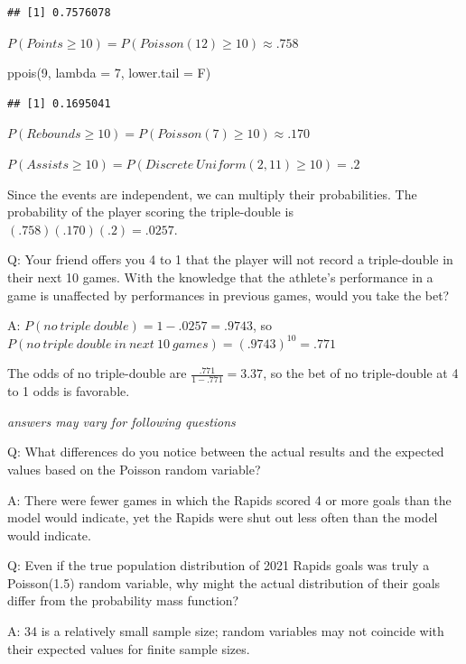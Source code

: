 \documentclass[
  11pt,
]{book}
\newenvironment{Shaded}{\begin{snugshade}}{\end{snugshade}}
\newcommand{\AttributeTok}[1]{\textcolor[rgb]{0.77,0.63,0.00}{#1}}
\newcommand{\DecValTok}[1]{\textcolor[rgb]{0.00,0.00,0.81}{#1}}
\newcommand{\FunctionTok}[1]{\textcolor[rgb]{0.00,0.00,0.00}{#1}}
\newcommand{\NormalTok}[1]{#1}
\theoremstyle{definition}
\theoremstyle{definition}
\theoremstyle{definition}
\theoremstyle{definition}
\theoremstyle{remark}
\begin{document}
\begin{verbatim}
## [1] 0.7576078
\end{verbatim}

\(P(Points \geq 10) = P(Poisson(12) \geq 10) \approx .758\)

\begin{Shaded}
\begin{Highlighting}[]
\FunctionTok{ppois}\NormalTok{(}\DecValTok{9}\NormalTok{, }\AttributeTok{lambda =} \DecValTok{7}\NormalTok{, }\AttributeTok{lower.tail =}\NormalTok{ F)}
\end{Highlighting}
\end{Shaded}

\begin{verbatim}
## [1] 0.1695041
\end{verbatim}

\(P(Rebounds \geq 10) = P(Poisson(7) \geq 10) \approx .170\)

\(P(Assists \geq 10) = P(Discrete\ Uniform(2, 11) \geq 10) = .2\)

Since the events are independent, we can multiply their probabilities. The probability of the player scoring the triple-double is \((.758)(.170)(.2) = .0257\).

Q: Your friend offers you 4 to 1 that the player will not record a triple-double in their next 10 games. With the knowledge that the athlete's performance in a game is unaffected by performances in previous games, would you take the bet?

A: \(P(no\ triple\ double) = 1 - .0257 = .9743\), so \(P(no\ triple\ double\ in\ next\ 10\ games) = (.9743)^{10} = .771\)

The odds of no triple-double are \(\frac{.771}{1-.771} = 3.37\), so the bet of no triple-double at 4 to 1 odds is favorable.

\emph{answers may vary for following questions}

Q: What differences do you notice between the actual results and the expected values based on the Poisson random variable?

A: There were fewer games in which the Rapids scored 4 or more goals than the model would indicate, yet the Rapids were shut out less often than the model would indicate.

Q: Even if the true population distribution of 2021 Rapids goals was truly a Poisson(1.5) random variable, why might the actual distribution of their goals differ from the probability mass function?

A: 34 is a relatively small sample size; random variables may not coincide with their expected values for finite sample sizes.
\end{document}
